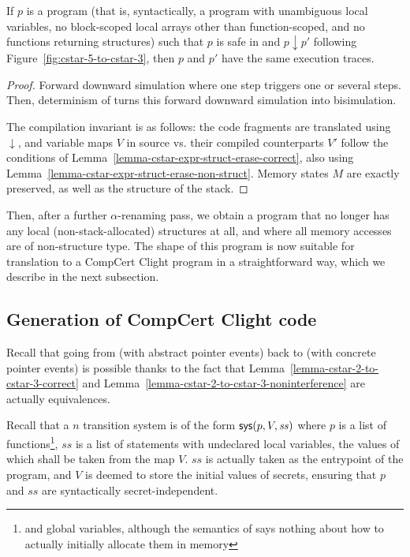 \begin{theorem}
  If $p$ is a  program (that is, syntactically, a \cstar program with
  unambiguous local variables, no block-scoped local arrays other than
  function-scoped, and no functions returning structures) such that
  $p$ is safe in  and $p \downarrow p'$ following
  Figure~\ref{fig:cstar-5-to-cstar-3}, then $p$ and $p'$ have the same
  execution traces.
\end{theorem}
\begin{proof}
  Forward downward simulation where one  step triggers one or
  several  steps. Then, determinism of  turns this forward
  downward simulation into bisimulation.

  The compilation invariant is as follows: the code fragments are
  translated using $\downarrow$, and variable maps $V$ in source 
  vs. their compiled  counterparts $V'$ follow the conditions of
  Lemma~\ref{lemma-cstar-expr-struct-erase-correct}, also using
  Lemma~\ref{lemma-cstar-expr-struct-erase-non-struct}. Memory states
  $M$ are exactly preserved, as well as the structure of the stack.
\end{proof}

Then, after a further $\alpha$-renaming pass, we obtain
a  program that no longer has any local (non-stack-allocated)
structures at all, and where all memory accesses are of non-structure
type. The shape of this program is now suitable for translation to a
CompCert Clight program in a straightforward way, which we describe
in the next subsection.

\subsection{Generation of CompCert Clight code} \label{sec:clight-gen}

Recall that going from  (with abstract pointer events) back to 
(with concrete pointer events) is possible thanks to the fact that
Lemma~\ref{lemma-cstar-2-to-cstar-3-correct} and
Lemma~\ref{lemma-cstar-2-to-cstar-3-noninterference} are actually
equivalences.

Recall that a \cstar$n$ transition system is of the form $\text{\textsf{sys}}(p, V,
\mathit{ss})$ where $p$ is a list of functions\footnote{and global
  variables, although the semantics of \cstar says nothing about how to
  actually initially allocate them in memory}, $\mathit{ss}$ is a list
of \cstar statements with undeclared local variables, the values of which
shall be taken from the map $V$. $\mathit{ss}$ is actually taken as
the entrypoint of the program, and $V$ is deemed to store the initial
values of secrets, ensuring that $p$ and $\mathit{ss}$ are
syntactically secret-independent.

